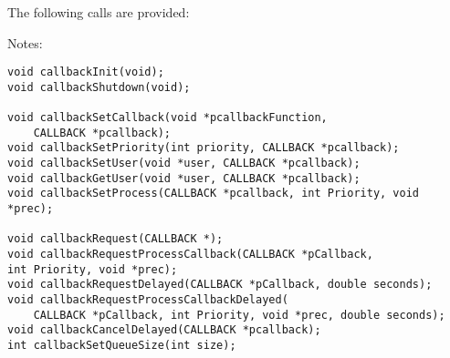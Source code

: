 The following calls are provided:

Notes:
\begin{verbatim}
void callbackInit(void);
void callbackShutdown(void);

void callbackSetCallback(void *pcallbackFunction,
    CALLBACK *pcallback);
void callbackSetPriority(int priority, CALLBACK *pcallback);
void callbackSetUser(void *user, CALLBACK *pcallback);
void callbackGetUser(void *user, CALLBACK *pcallback);
void callbackSetProcess(CALLBACK *pcallback, int Priority, void *prec);

void callbackRequest(CALLBACK *);
void callbackRequestProcessCallback(CALLBACK *pCallback,
int Priority, void *prec);
void callbackRequestDelayed(CALLBACK *pCallback, double seconds);
void callbackRequestProcessCallbackDelayed(
    CALLBACK *pCallback, int Priority, void *prec, double seconds);
void callbackCancelDelayed(CALLBACK *pcallback);
int callbackSetQueueSize(int size);
\end{verbatim}

